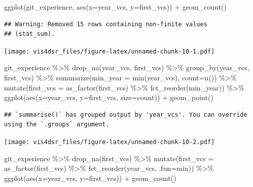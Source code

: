 \documentclass[
]{krantz}
\makeatletter
\newenvironment{Shaded}{\begin{snugshade}}{\end{snugshade}}
\newcommand{\AttributeTok}[1]{\textcolor[rgb]{0.61,0.61,0.61}{#1}}
\newcommand{\FunctionTok}[1]{\textcolor[rgb]{0,0,0}{#1}}
\newcommand{\NormalTok}[1]{#1}
\newcommand{\SpecialCharTok}[1]{\textcolor[rgb]{0,0,0}{#1}}
\newenvironment{kframe}{%
\medskip{}
\setlength{\fboxsep}{.8em}
 \def\at@end@of@kframe{}%
 \ifinner\ifhmode%
  \def\at@end@of@kframe{\end{minipage}}%
  \begin{minipage}{\columnwidth}%
 \fi\fi%
 \def\FrameCommand##1{\hskip\@totalleftmargin \hskip-\fboxsep
 \colorbox{shadecolor}{##1}\hskip-\fboxsep
     \hskip-\linewidth \hskip-\@totalleftmargin \hskip\columnwidth}%
 \MakeFramed {\advance\hsize-\width
   \@totalleftmargin\z@ \linewidth\hsize
   \@setminipage}}%
 {\par\unskip\endMakeFramed%
 \at@end@of@kframe}
\renewenvironment{Shaded}{\begin{kframe}}{\end{kframe}}
\makeatother
\begin{document}
\begin{Shaded}
\begin{Highlighting}[]
\FunctionTok{ggplot}\NormalTok{(git\_experience, }\FunctionTok{aes}\NormalTok{(}\AttributeTok{x=}\NormalTok{year\_vcs, }\AttributeTok{y=}\NormalTok{first\_vcs)) }\SpecialCharTok{+}
  \FunctionTok{geom\_count}\NormalTok{()}
\end{Highlighting}
\end{Shaded}

\begin{verbatim}
## Warning: Removed 15 rows containing non-finite values
## (stat_sum).
\end{verbatim}

\texttt{[image: vis4dsr\_files/figure-latex/unnamed-chunk-10-1.pdf]}

\begin{Shaded}
\begin{Highlighting}[]
\NormalTok{git\_experience }\SpecialCharTok{\%\textgreater{}\%}
  \FunctionTok{drop\_na}\NormalTok{(year\_vcs, first\_vcs) }\SpecialCharTok{\%\textgreater{}\%}
  \FunctionTok{group\_by}\NormalTok{(year\_vcs, first\_vcs) }\SpecialCharTok{\%\textgreater{}\%}
  \FunctionTok{summarize}\NormalTok{(}\AttributeTok{min\_year =} \FunctionTok{min}\NormalTok{(year\_vcs),}
            \AttributeTok{count=}\FunctionTok{n}\NormalTok{()) }\SpecialCharTok{\%\textgreater{}\%}
  \FunctionTok{mutate}\NormalTok{(}\AttributeTok{first\_vcs =} \FunctionTok{as\_factor}\NormalTok{(first\_vcs) }\SpecialCharTok{\%\textgreater{}\%} 
           \FunctionTok{fct\_reorder}\NormalTok{(min\_year)) }\SpecialCharTok{\%\textgreater{}\%}
  \FunctionTok{ggplot}\NormalTok{(}\FunctionTok{aes}\NormalTok{(}\AttributeTok{x=}\NormalTok{year\_vcs, }\AttributeTok{y=}\NormalTok{first\_vcs, }\AttributeTok{size=}\NormalTok{count)) }\SpecialCharTok{+}
  \FunctionTok{geom\_point}\NormalTok{()}
\end{Highlighting}
\end{Shaded}

\begin{verbatim}
## `summarise()` has grouped output by 'year_vcs'. You can override using the `.groups` argument.
\end{verbatim}

\texttt{[image: vis4dsr\_files/figure-latex/unnamed-chunk-10-2.pdf]}

\begin{Shaded}
\begin{Highlighting}[]
\NormalTok{git\_experience }\SpecialCharTok{\%\textgreater{}\%}
  \FunctionTok{drop\_na}\NormalTok{(first\_vcs) }\SpecialCharTok{\%\textgreater{}\%}
  \FunctionTok{mutate}\NormalTok{(}\AttributeTok{first\_vcs =} \FunctionTok{as\_factor}\NormalTok{(first\_vcs) }\SpecialCharTok{\%\textgreater{}\%} 
           \FunctionTok{fct\_reorder}\NormalTok{(year\_vcs, }\AttributeTok{.fun=}\NormalTok{min)) }\SpecialCharTok{\%\textgreater{}\%}
  \FunctionTok{ggplot}\NormalTok{(}\FunctionTok{aes}\NormalTok{(}\AttributeTok{x=}\NormalTok{year\_vcs, }\AttributeTok{y=}\NormalTok{first\_vcs)) }\SpecialCharTok{+}
  \FunctionTok{geom\_count}\NormalTok{()}
\end{Highlighting}
\end{Shaded}
\end{document}
